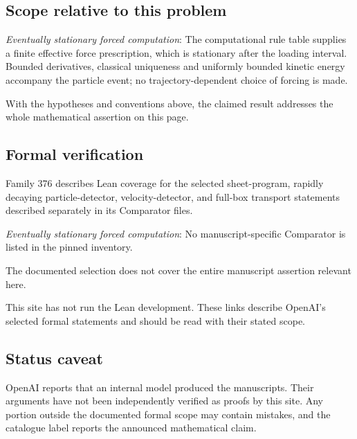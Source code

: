 \documentclass[11pt]{article}
\begin{document}
\subsection{Scope relative to this problem}
\textit{Eventually stationary forced computation}: The computational rule table supplies a finite effective force prescription, which is stationary after the loading interval. Bounded derivatives, classical uniqueness and uniformly bounded kinetic energy accompany the particle event; no trajectory-dependent choice of forcing is made.

With the hypotheses and conventions above, the claimed result addresses the whole mathematical assertion on this page.

\subsection{Formal verification}
Family 376 describes Lean coverage for the selected sheet-program, rapidly decaying particle-detector, velocity-detector, and full-box transport statements described separately in its Comparator files.

\textit{Eventually stationary forced computation}: No manuscript-specific Comparator is listed in the pinned inventory.

The documented selection does not cover the entire manuscript assertion relevant here.

This site has not run the Lean development. These links describe OpenAI’s selected formal statements and should be read with their stated scope.

\subsection{Status caveat}
OpenAI reports that an internal model produced the manuscripts. Their arguments have not been independently verified as proofs by this site. Any portion outside the documented formal scope may contain mistakes, and the catalogue label reports the announced mathematical claim.
\end{document}
